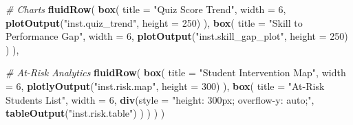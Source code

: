 \documentclass[
]{article}
\newenvironment{Shaded}{\begin{snugshade}}{\end{snugshade}}
\newcommand{\AttributeTok}[1]{\textcolor[rgb]{0.13,0.29,0.53}{#1}}
\newcommand{\CommentTok}[1]{\textcolor[rgb]{0.56,0.35,0.01}{\textit{#1}}}
\newcommand{\DecValTok}[1]{\textcolor[rgb]{0.00,0.00,0.81}{#1}}
\newcommand{\FunctionTok}[1]{\textcolor[rgb]{0.13,0.29,0.53}{\textbf{#1}}}
\newcommand{\NormalTok}[1]{#1}
\newcommand{\StringTok}[1]{\textcolor[rgb]{0.31,0.60,0.02}{#1}}
\begin{document}
\begin{Shaded}
\begin{Highlighting}[]
  \CommentTok{\# Charts}
  \FunctionTok{fluidRow}\NormalTok{(}
    \FunctionTok{box}\NormalTok{(}
      \AttributeTok{title =} \StringTok{"Quiz Score Trend"}\NormalTok{, }\AttributeTok{width =} \DecValTok{6}\NormalTok{,}
      \FunctionTok{plotOutput}\NormalTok{(}\StringTok{"inst.quiz\_trend"}\NormalTok{, }\AttributeTok{height =} \DecValTok{250}\NormalTok{)}
\NormalTok{    ),}
    \FunctionTok{box}\NormalTok{(}
      \AttributeTok{title =} \StringTok{"Skill to Performance Gap"}\NormalTok{, }\AttributeTok{width =} \DecValTok{6}\NormalTok{,}
      \FunctionTok{plotOutput}\NormalTok{(}\StringTok{"inst.skill\_gap\_plot"}\NormalTok{, }\AttributeTok{height =} \DecValTok{250}\NormalTok{)}
\NormalTok{    )}
\NormalTok{  ),}
  
  \CommentTok{\# At{-}Risk Analytics}
  \FunctionTok{fluidRow}\NormalTok{(}
    \FunctionTok{box}\NormalTok{(}
      \AttributeTok{title =} \StringTok{"Student Intervention Map"}\NormalTok{, }\AttributeTok{width =} \DecValTok{6}\NormalTok{,}
      \FunctionTok{plotlyOutput}\NormalTok{(}\StringTok{"inst.risk.map"}\NormalTok{, }\AttributeTok{height =} \DecValTok{300}\NormalTok{)}
\NormalTok{    ),}
    \FunctionTok{box}\NormalTok{(}
      \AttributeTok{title =} \StringTok{"At{-}Risk Students List"}\NormalTok{, }\AttributeTok{width =} \DecValTok{6}\NormalTok{,}
      \FunctionTok{div}\NormalTok{(}\AttributeTok{style =} \StringTok{"height: 300px; overflow{-}y: auto;"}\NormalTok{,}
          \FunctionTok{tableOutput}\NormalTok{(}\StringTok{"inst.risk.table"}\NormalTok{)}
\NormalTok{      )}
\NormalTok{    )}
\NormalTok{  )}
\NormalTok{)}


\end{Highlighting}
\end{Shaded}
\end{document}
